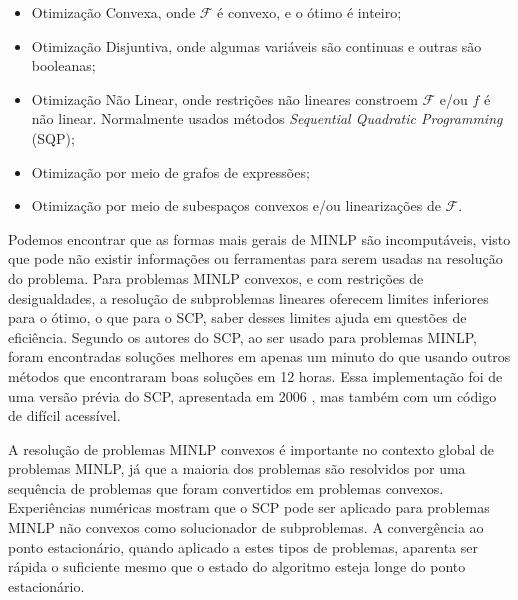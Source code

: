 \begin{itemize}
\item Otimização Convexa, onde \( \mathcal{F} \) é convexo, e o ótimo é inteiro;
\item Otimização Disjuntiva, onde algumas variáveis são continuas e outras são booleanas;
\item Otimização Não Linear, onde restrições não lineares constroem \(\mathcal{F}\) e/ou \(f\) é não linear. Normalmente usados métodos \textit{Sequential Quadratic Programming} (SQP);
\item Otimização por meio de grafos de expressões;
\item Otimização por meio de subespaços convexos e/ou linearizações de \(\mathcal{F}\).
\end{itemize}

Podemos encontrar que as formas mais gerais de MINLP são incomputáveis, visto que pode não existir
informações ou ferramentas para serem usadas na resolução do problema. Para problemas MINLP convexos,
e com restrições de desigualdades, a resolução de subproblemas lineares oferecem limites inferiores para
o ótimo, o que para o SCP, saber desses limites ajuda em questões de eficiência. Segundo os autores do
SCP, ao ser usado para problemas MINLP, foram encontradas soluções melhores em apenas um minuto do que
usando outros métodos que encontraram boas soluções em 12 horas. Essa implementação foi de uma versão
prévia do SCP, apresentada em 2006 \cite{Still_2005}, mas também com um código de difícil acessível.

A resolução de problemas MINLP convexos é importante no contexto global de problemas MINLP, já
que a maioria dos problemas são resolvidos por uma sequência de problemas que foram convertidos em
problemas convexos. Experiências numéricas mostram que o SCP pode ser aplicado para problemas MINLP
não convexos como solucionador de subproblemas. A convergência ao ponto estacionário, quando aplicado
a estes tipos de problemas, aparenta ser rápida o suficiente mesmo que o estado do algoritmo esteja
longe do ponto estacionário.